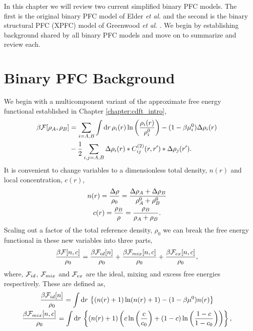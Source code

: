 \label{chapter:binary}

In this chapter we will review two current simplified binary PFC models.  The
first is the original binary PFC model of Elder \textit{et al.} \cite{ELDER07}
and the second is the binary structural PFC (XPFC) model of Greenwood
\textit{et al.} \cite{GREENWOOD11_BINARY}. We begin by establishing background
shared by all binary PFC models and move on to summarize and review each.

\section{Binary PFC Background} %

We begin with a multicomponent variant of the approximate free energy
functional established in Chapter \ref{chapter:cdft_intro},
%
\begin{align}
    \label{binary_cdft_free_energy}
    \beta\mathcal{F}[\rho_A, \rho_B] &= \sum_{i=A, B} \int \mathrm{d}r 
        \,\rho_i(r) \ln\left(\frac{\rho_i(r)}{\rho_i^0}\right) 
        - (1 - \beta\mu_i^0)\Delta\rho_i(r)\\
    &- \frac{1}{2} \sum_{i,j=A, B} \Delta\rho_i(r) \ast C^{(2)}_{ij}(r, r^\prime) 
        \ast \Delta\rho_j(r^\prime). \nonumber
\end{align}
%
It is convenient to change variables to a dimensionless total density, $n(r)$
and local concentration, $c(r)$,
%
\begin{gather}
    n(r) = \frac{\Delta \rho}{\rho_0} = \frac{\Delta\rho_A + \Delta\rho_B}{\rho_A^0 + \rho_B^0} \\
    c(r) = \frac{\rho_B}{\rho} = \frac{\rho_B}{\rho_A + \rho_B}.
\end{gather}
%
Scaling out a factor of the total reference density, $\rho_0$ we can break the
free energy functional in these new variables into three parts,
%
\begin{equation}
    \label{binary_total_free_energy}
    \frac{\beta\mathcal{F}[n, c]}{\rho_0} = \frac{\beta\mathcal{F}_{id}[n]}{\rho_0} 
        + \frac{\beta\mathcal{F}_{mix}[n, c]}{\rho_0}
        + \frac{\beta\mathcal{F}_{ex}[n, c]}{\rho_0},
\end{equation}
%
where, $\mathcal{F}_{id}$, $\mathcal{F}_{mix}$ and $\mathcal{F}_{ex}$ are the ideal, mixing and excess
free energies respectively. These are defined as,
%
\begin{gather}
    \label{binary_ideal}
    \frac{\beta\mathcal{F}_{id}[n]}{\rho_0} =
        \int \mathrm{d}r \,\left\lbrace (n(r) + 1)\ln(n(r) + 1) 
        - (1 - \beta\mu^0)n(r) \right\rbrace \\
    \label{binary_mixing}
    \frac{\beta\mathcal{F}_{mix}[n, c]}{\rho_0} =
        \int \mathrm{d}r \,\left\lbrace (n(r) + 1)\left( 
            c\ln\left(\frac{c}{c_0}\right) + (1-c)\ln\left(\frac{1-c}{1-c_0}\right) \right)\right\rbrace, 
\end{gather}
